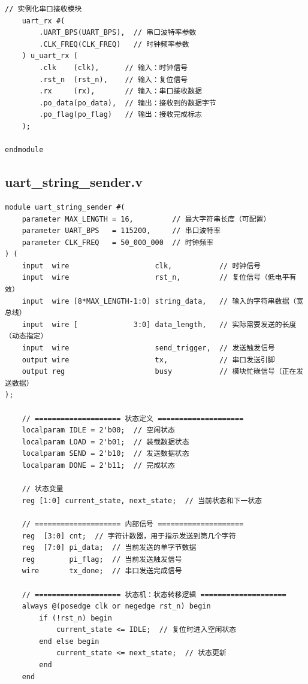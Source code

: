 \documentclass[a4paper,10pt]{article}
\begin{document}
\begin{lstlisting}[caption=uart_parser.v]
    // 实例化串口接收模块
    uart_rx #(
        .UART_BPS(UART_BPS),  // 串口波特率参数
        .CLK_FREQ(CLK_FREQ)   // 时钟频率参数
    ) u_uart_rx (
        .clk    (clk),      // 输入：时钟信号
        .rst_n  (rst_n),    // 输入：复位信号
        .rx     (rx),       // 输入：串口接收数据
        .po_data(po_data),  // 输出：接收到的数据字节
        .po_flag(po_flag)   // 输出：接收完成标志
    );

endmodule

\end{lstlisting}

\subsection{uart_string_sender.v}
\begin{lstlisting}[caption=uart_string_sender.v]
module uart_string_sender #(
    parameter MAX_LENGTH = 16,         // 最大字符串长度（可配置）
    parameter UART_BPS   = 115200,     // 串口波特率
    parameter CLK_FREQ   = 50_000_000  // 时钟频率
) (
    input  wire                    clk,           // 时钟信号
    input  wire                    rst_n,         // 复位信号（低电平有效）
    input  wire [8*MAX_LENGTH-1:0] string_data,   // 输入的字符串数据（宽总线）
    input  wire [             3:0] data_length,   // 实际需要发送的长度（动态指定）
    input  wire                    send_trigger,  // 发送触发信号
    output wire                    tx,            // 串口发送引脚
    output reg                     busy           // 模块忙碌信号（正在发送数据）
);

    // ==================== 状态定义 ====================
    localparam IDLE = 2'b00;  // 空闲状态
    localparam LOAD = 2'b01;  // 装载数据状态
    localparam SEND = 2'b10;  // 发送数据状态
    localparam DONE = 2'b11;  // 完成状态

    // 状态变量
    reg [1:0] current_state, next_state;  // 当前状态和下一状态

    // ==================== 内部信号 ====================
    reg  [3:0] cnt;  // 字符计数器，用于指示发送到第几个字符
    reg  [7:0] pi_data;  // 当前发送的单字节数据
    reg        pi_flag;  // 当前发送触发信号
    wire       tx_done;  // 串口发送完成信号

    // ==================== 状态机：状态转移逻辑 ====================
    always @(posedge clk or negedge rst_n) begin
        if (!rst_n) begin
            current_state <= IDLE;  // 复位时进入空闲状态
        end else begin
            current_state <= next_state;  // 状态更新
        end
    end


\end{lstlisting}
\end{document}
